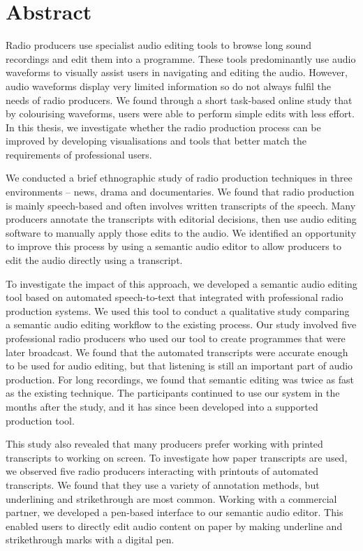 \chapter*{Abstract}

Radio producers use specialist audio editing tools to browse long sound recordings and edit them into a programme.
These tools predominantly use audio waveforms to visually assist users in navigating and editing the audio.  However,
audio waveforms display very limited information so do not always fulfil the needs of radio producers. We found through
a short task-based online study that by colourising waveforms, users were able to perform simple edits with less
effort. In this thesis, we investigate whether the radio production process can be improved by developing
visualisations and tools that better match the requirements of professional users.

We conducted a brief ethnographic study of radio production techniques in three environments – news, drama and
documentaries. We found that radio production is mainly speech-based and often involves written transcripts of the
speech. Many producers annotate the transcripts with editorial decisions, then use audio editing software to manually
apply those edits to the audio. We identified an opportunity to improve this process by using a semantic audio editor
to allow producers to edit the audio directly using a transcript.

To investigate the impact of this approach, we developed a semantic audio editing tool based on automated
speech-to-text that integrated with professional radio production systems. We used this tool to conduct a qualitative
study comparing a semantic audio editing workflow to the existing process. Our study involved five professional radio
producers who used our tool to create programmes that were later broadcast. We found that the automated transcripts
were accurate enough to be used for audio editing, but that listening is still an important part of audio production.
For long recordings, we found that semantic editing was twice as fast as the existing technique. The participants
continued to use our system in the months after the study, and it has since been developed into a supported production
tool.

This study also revealed that many producers prefer working with printed transcripts to working on screen. To
investigate how paper transcripts are used, we observed five radio producers interacting with printouts of automated
transcripts. We found that they use a variety of annotation methods, but underlining and strikethrough are most common.
Working with a commercial partner, we developed a pen-based interface to our semantic audio editor. This enabled users
to directly edit audio content on paper by making underline and strikethrough marks with a digital pen.

